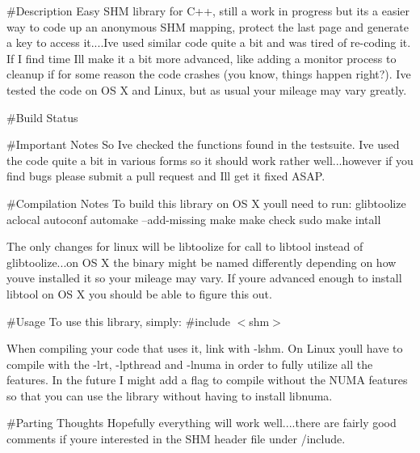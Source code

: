 \#\+Description Easy S\+HM library for C++, still a work in progress but it\textquotesingle{}s a easier way to code up an anonymous S\+HM mapping, protect the last page and generate a key to access it....I\textquotesingle{}ve used similar code quite a bit and was tired of re-\/coding it. If I find time I\textquotesingle{}ll make it a bit more advanced, like adding a monitor process to cleanup if for some reason the code crashes (you know, things happen right?). I\textquotesingle{}ve tested the code on OS X and Linux, but as usual your mileage may vary greatly.

\#\+Build Status \href{https://travis-ci.org/RaftLib/shm}{\tt }

\#\+Important Notes So I\textquotesingle{}ve checked the functions found in the testsuite. I\textquotesingle{}ve used the code quite a bit in various forms so it should work rather well...however if you find bugs please submit a pull request and I\textquotesingle{}ll get it fixed A\+S\+AP.

\#\+Compilation Notes To build this library on OS X you\textquotesingle{}ll need to run\+: glibtoolize aclocal autoconf automake --add-\/missing make make check sudo make intall

The only changes for linux will be libtoolize for call to libtool instead of glibtoolize...on OS X the binary might be named differently depending on how you\textquotesingle{}ve installed it so your mileage may vary. If you\textquotesingle{}re advanced enough to install libtool on OS X you should be able to figure this out.

\#\+Usage To use this library, simply\+: \#include $<$shm$>$

When compiling your code that uses it, link with -\/lshm. On Linux you\textquotesingle{}ll have to compile with the -\/lrt, -\/lpthread and -\/lnuma in order to fully utilize all the features. In the future I might add a flag to compile without the N\+U\+MA features so that you can use the library without having to install libnuma.

\#\+Parting Thoughts Hopefully everything will work well....there are fairly good comments if you\textquotesingle{}re interested in the S\+HM header file under /include. 